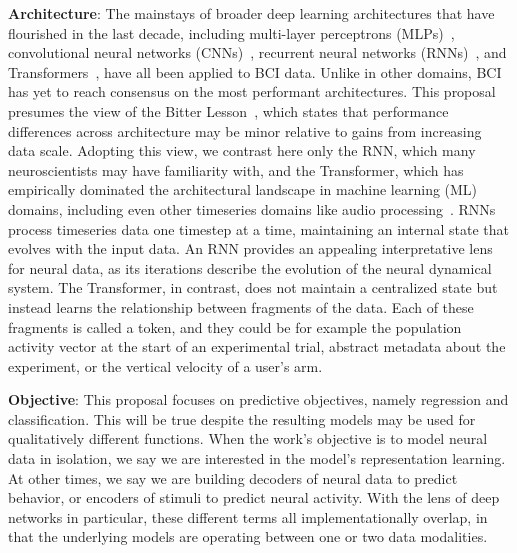 \documentclass[12pt,oneside]{report}
\begin{document}
\textbf{Architecture}: The mainstays of broader deep learning architectures that have flourished in the last decade, including multi-layer perceptrons (MLPs)~\citep{Willsey2022HighVelocity}, convolutional neural networks (CNNs)~\citep{temmar2024artificial}, recurrent neural networks (RNNs)~\citep{pandarinath_18_lfads}, and Transformers~\citep{ye_21_ndt}, have all been applied to BCI data. Unlike in other domains, BCI has yet to reach consensus on the most performant architectures. This proposal presumes the view of the Bitter Lesson~\citep{sutton2019}, which states that performance differences across architecture may be minor relative to gains from increasing data scale. Adopting this view, we contrast here only the RNN, which many neuroscientists may have familiarity with, and the Transformer, which has empirically dominated the architectural landscape in machine learning (ML) domains, including even other timeseries domains like audio processing~\citep{radford2022whisper}. RNNs process timeseries data one timestep at a time, maintaining an internal state that evolves with the input data. An RNN provides an appealing interpretative lens for neural data, as its iterations describe the evolution of the neural dynamical system. The Transformer, in contrast, does not maintain a centralized state but instead learns the relationship between fragments of the data. Each of these fragments is called a token, and they could be for example the population activity vector at the start of an experimental trial, abstract metadata about the experiment, or the vertical velocity of a user’s arm.

\textbf{Objective}: This proposal focuses on predictive objectives, namely regression and classification. This will be true despite the resulting models may be used for qualitatively different functions. When the work’s objective is to model neural data in isolation, we say we are interested in the model’s representation learning. At other times, we say we are building decoders of neural data to predict behavior, or encoders of stimuli to predict neural activity. With the lens of deep networks in particular, these different terms all implementationally overlap, in that the underlying models are operating between one or two data modalities.
\end{document}
